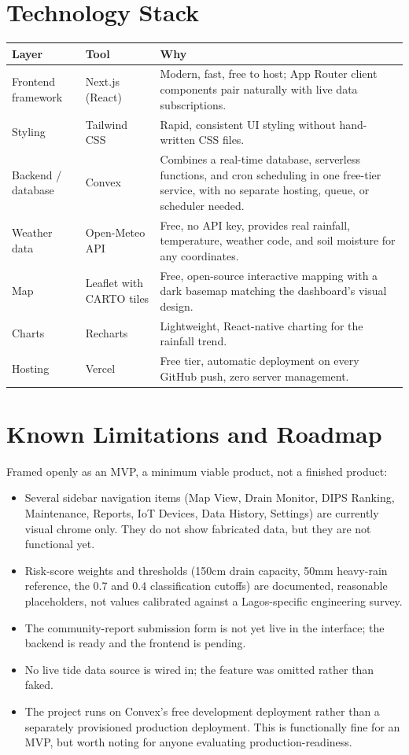 \documentclass[11pt]{article}
\begin{document}
\section{Technology Stack}
\begin{center}
\small
\begin{tabular}{@{}p{2.6cm}p{3.4cm}p{7.6cm}@{}}
\toprule
\textbf{Layer} & \textbf{Tool} & \textbf{Why} \\
\midrule
Frontend framework & Next.js (React) & Modern, fast, free to host; App Router client components pair naturally with live data subscriptions. \\
Styling & Tailwind CSS & Rapid, consistent UI styling without hand-written CSS files. \\
Backend / database & Convex & Combines a real-time database, serverless functions, and cron scheduling in one free-tier service, with no separate hosting, queue, or scheduler needed. \\
Weather data & Open-Meteo API & Free, no API key, provides real rainfall, temperature, weather code, and soil moisture for any coordinates. \\
Map & Leaflet with CARTO tiles & Free, open-source interactive mapping with a dark basemap matching the dashboard's visual design. \\
Charts & Recharts & Lightweight, React-native charting for the rainfall trend. \\
Hosting & Vercel & Free tier, automatic deployment on every GitHub push, zero server management. \\
\bottomrule
\end{tabular}
\end{center}

\section{Known Limitations and Roadmap}
Framed openly as an MVP, a minimum viable product, not a finished product:
\begin{itemize}
  \item Several sidebar navigation items (Map View, Drain Monitor, DIPS Ranking, Maintenance, Reports, IoT Devices, Data History, Settings) are currently visual chrome only. They do not show fabricated data, but they are not functional yet.
  \item Risk-score weights and thresholds (150cm drain capacity, 50mm heavy-rain reference, the 0.7 and 0.4 classification cutoffs) are documented, reasonable placeholders, not values calibrated against a Lagos-specific engineering survey.
  \item The community-report submission form is not yet live in the interface; the backend is ready and the frontend is pending.
  \item No live tide data source is wired in; the feature was omitted rather than faked.
  \item The project runs on Convex's free development deployment rather than a separately provisioned production deployment. This is functionally fine for an MVP, but worth noting for anyone evaluating production-readiness.
\end{itemize}
\end{document}
